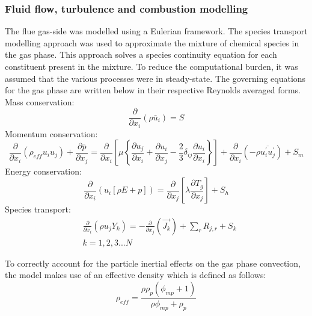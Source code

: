 \documentclass[11pt,cleanfoot]{asme2ej}
\begin{document}
\subsubsection{Fluid flow, turbulence and combustion modelling}
The flue gas-side was modelled using a Eulerian framework. The species transport modelling approach was used to approximate the mixture of chemical species in the gas phase. This approach solves a species continuity equation for each constituent present in the mixture. To reduce the computational burden, it was assumed that the various processes were in steady-state. The governing equations for the gas phase are written below in their respective Reynolds averaged forms.
Mass conservation:
\begin{equation}\label{eqn_RANS_mass}
\frac{\partial}{\partial x_{i}}(\rho \bar{u}_{i})=S
\end{equation}
Momentum conservation:
\begin{equation}\label{eqn_momentum}
\frac{\partial}{\partial x_{i}}(\rho_{eff} u_{i}u_{j})+\frac{\partial \overline{p}}{\partial x_{j}}=\frac{\partial}{\partial x_{i}}\left[\mu\left\{\frac{\partial u_{j}}{\partial x_{i}}+\frac{\partial u_{i}}{\partial x_{j}}-\frac{2}{3}\delta_{ij}\frac{\partial u_{i}}{\partial x_{i}}\right\}\right]+\frac{\partial}{\partial x_{i}}(-\rho\overline{u_{i}^{'}u_{j}^{'}})+S_m
\end{equation}
Energy conservation:
\begin{equation}\label{eqn_energy}
\frac{\partial }{\partial x_{i}} (u_{i}[\rho E+p])=\frac{\partial }{\partial x_{j}}\left[\lambda\frac{\partial T_{g}}{\partial x_{j}}\right] +S_{h}
\end{equation}
Species transport:
\begin{equation}\label{eqn_species}
\begin{split}
&\frac{\partial}{\partial x_{i}}(\rho u_{j}Y_{k})=-\frac{\partial}{\partial x_{j}}(\vec{J_{k}})+ \sum_r R_{j,r} + S_{k}\\
&k = 1,2,3...N
\end{split}
\end{equation}

To correctly account for the particle inertial effects on the gas phase convection, the model makes use of an effective density which is defined as follows:
\begin{equation} \label{eqn_eff_rho}
	\rho_{eff} = \frac{\rho \rho_p \left( \phi_{mp} + 1 \right)}{\rho \phi_{mp} + \rho_p}
\end{equation}
\end{document}
